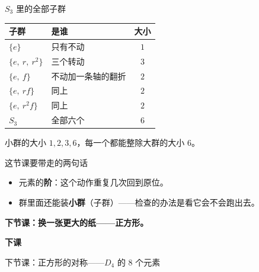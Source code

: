 \documentclass[10pt]{beamer}
\begin{document}
\begin{frame}{\(S_3\) 里的全部子群}
  \begin{center}
  \begin{tabular}{@{}llc@{}}
    \toprule
    子群 & 是谁 & 大小 \\
    \midrule
    \(\{e\}\) & 只有不动 & \(1\) \\
    \(\{e,\ r,\ r^2\}\) & 三个转动 & \(3\) \\
    \(\{e,\ f\}\) & 不动加一条轴的翻折 & \(2\) \\
    \(\{e,\ rf\}\) & 同上 & \(2\) \\
    \(\{e,\ r^2f\}\) & 同上 & \(2\) \\
    \(S_3\) & 全部六个 & \(6\) \\
    \bottomrule
  \end{tabular}
  \end{center}
  \pause
  \begin{center}
    {\large 小群的大小 \(1,2,3,6\)，每一个都能整除大群的大小 \(6\)。}
  \end{center}
\end{frame}

\begin{frame}{这节课要带走的两句话}
  \begin{itemize}
    \item 元素的\textbf{阶}：这个动作重复几次回到原位。
    \item 群里面还能装\textbf{小群}（子群）——检查的办法是看它会不会跑出去。
  \end{itemize}
  \pause
  \begin{center}
    {\large\textcolor{textgreen}{\bfseries 下节课：换一张更大的纸——正方形。}}
  \end{center}
\end{frame}

\begin{frame}
  \begin{center}
    \vspace{1.6cm}
    {\Large\textcolor{textgreen}{\bfseries 下课}}

    \vspace{1.0cm}
    {\large\textcolor{accentgreen}{下节课：正方形的对称——\(D_4\) 的 \(8\) 个元素}}
  \end{center}
\end{frame}
\end{document}
